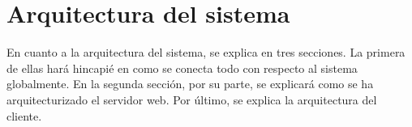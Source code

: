 \section{Arquitectura del sistema}

En cuanto a la arquitectura del sistema, se explica en tres secciones. La primera de ellas hará hincapié en como se conecta todo con respecto al sistema globalmente. En la segunda sección, por su parte, se explicará como se ha arquitecturizado el servidor web. Por último, se explica la arquitectura del cliente.



\newpage
